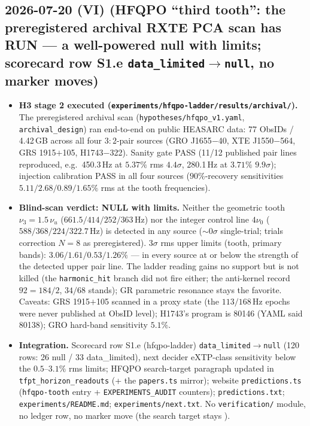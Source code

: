 \subsection*{2026-07-20 (VI) (HFQPO ``third tooth'': the preregistered archival RXTE PCA scan has RUN --- a well-powered null with limits; scorecard row S1.e \texttt{data\_limited}$\to$\texttt{null}, no marker moves)}
\begin{itemize}[leftmargin=1.5em]
\item \textbf{H3 stage 2 executed (\texttt{experiments/hfqpo-ladder/results/archival/}).} The preregistered
archival scan (\texttt{hypotheses/hfqpo\_v1.yaml}, \texttt{archival\_design}) ran end-to-end on public
HEASARC data: 77 ObsIDs / 4.42\,GB across all four $3{:}2$-pair sources (GRO J1655$-$40, XTE J1550$-$564,
GRS 1915$+$105, H1743$-$322). Sanity gate PASS (11/12 published pair lines reproduced, e.g.\ 450.3\,Hz at
$5.37\%$ rms $4.4\sigma$, 280.1\,Hz at $3.71\%$ $9.9\sigma$); injection calibration PASS in all four
sources ($90\%$-recovery sensitivities $5.11/2.68/0.89/1.65\%$ rms at the tooth frequencies).
\item \textbf{Blind-scan verdict: NULL with limits.} Neither the geometric tooth $\nu_3=1.5\,\nu_u$
($661.5/414/252/363$\,Hz) nor the integer control line $4\nu_0$ ($588/368/224/322.7$\,Hz) is detected in
any source ($\sim\!0\sigma$ single-trial; trials correction $N{=}8$ as preregistered). $3\sigma$ rms upper
limits (tooth, primary bands): $3.06/1.61/0.53/1.26\%$ --- in every source at or below the strength of the
detected upper pair line. The ladder reading gains no support but is not killed (the \texttt{harmonic\_hit}
branch did not fire either; the anti-kernel record $92{=}184/2$, $34/68$ stands); GR parametric resonance
stays the favorite. Caveats: GRS 1915$+$105 scanned in a proxy state (the $113/168$\,Hz epochs were never
published at ObsID level); H1743's program is 80146 (YAML said 80138); GRO hard-band sensitivity $5.1\%$.
\item \textbf{Integration.} Scorecard row S1.e (hfqpo-ladder) \texttt{data\_limited}$\to$\texttt{null}
(120 rows: 26 null / 33 data\_limited), next decider eXTP-class sensitivity below the $0.5$--$3.1\%$ rms
limits; HFQPO search-target paragraph updated in \texttt{tfpt\_horizon\_readouts} (+ the
\texttt{papers.ts} mirror); website \texttt{predictions.ts} (\texttt{hfqpo-tooth} entry +
\texttt{EXPERIMENTS\_AUDIT} counters); \texttt{predictions.txt}; \texttt{experiments/README.md};
\texttt{experiments/next.txt}. No \texttt{verification/} module, no ledger row, no marker move
(the search target stays \mO).
\end{itemize}

